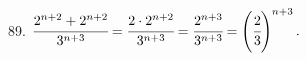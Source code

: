 89. $\cfrac{2^{n+2}+2^{n+2}}{3^{n+3}}=\cfrac{2\cdot2^{n+2}}{3^{n+3}}=\cfrac{2^{n+3}}{3^{n+3}}=\left(\cfrac{2}{3}\right)^{n+3}.$\\
